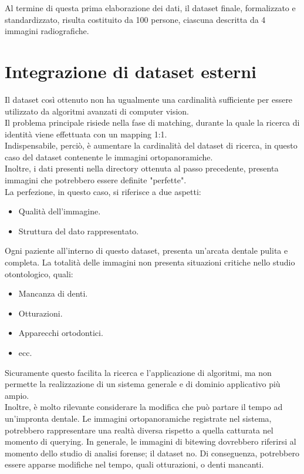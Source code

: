 \documentclass[12pt,a4paper,openright,twoside]{book}
\begin{document}
Al termine di questa prima elaborazione dei dati, il dataset finale, formalizzato e standardizzato, risulta costituito da 100 persone, ciascuna descritta da 4 immagini radiografiche.


\section{Integrazione di dataset esterni}
Il dataset così ottenuto non ha ugualmente una cardinalità sufficiente per essere utilizzato da algoritmi avanzati di computer vision. \\
Il problema principale risiede nella fase di matching, durante la quale la ricerca di identità viene effettuata con un mapping 1:1.\\
Indispensabile, perciò, è aumentare la cardinalità del dataset di ricerca, in questo caso del dataset contenente le immagini ortopanoramiche.\\
Inoltre, i dati presenti nella directory ottenuta al passo precedente, presenta immagini che potrebbero essere definite "perfette".\\
La perfezione, in questo caso, si riferisce a due aspetti:
\begin{itemize}
\item Qualità dell'immagine.
\item Struttura del dato rappresentato.
\end{itemize}

Ogni paziente all'interno di questo dataset, presenta un'arcata dentale pulita e completa. La totalità delle immagini non presenta situazioni critiche nello studio otontologico, quali:
\begin{itemize}
\item Mancanza di denti.
\item Otturazioni.
\item Apparecchi ortodontici.
\item ecc.
\end{itemize}

Sicuramente questo facilita la ricerca e l'applicazione di algoritmi, ma non permette la realizzazione di un sistema generale e di dominio applicativo più ampio. \\
Inoltre, è molto rilevante considerare la modifica che può partare il tempo ad un'impronta dentale. Le immagini ortopanoramiche registrate nel sistema, potrebbero rappresentare una realtà diversa rispetto a quella catturata nel momento di querying. In generale, le immagini di bitewing dovrebbero riferirsi al momento dello studio di analisi forense; il dataset no. Di conseguenza, potrebbero essere apparse modifiche nel tempo, quali otturazioni, o denti mancanti.\\
\end{document}
